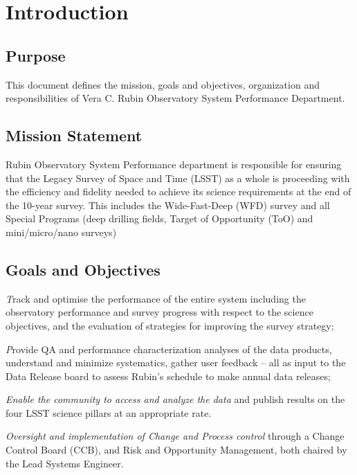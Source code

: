 \section{Introduction}
\subsection{Purpose}

This document defines the mission, goals and objectives, organization and responsibilities of Vera C. Rubin Observatory System Performance Department.

\subsection{Mission Statement}

Rubin Observatory System Performance department is responsible for ensuring that the Legacy Survey of Space and Time (LSST) as a whole is proceeding with the efficiency and fidelity needed to achieve its science requirements at the end of the 10-year survey. 
This includes the Wide-Fast-Deep (WFD) survey and all Special Programs (deep drilling fields, Target of Opportunity (ToO) and mini/micro/nano surveys)


\subsection{Goals and Objectives}

{\emph Track  and optimise} the performance of the entire system including the observatory performance and survey progress with respect to the science objectives, and the evaluation of strategies for improving the survey strategy;

{\emph Provide QA and performance characterization analyses}  of the data products, understand and minimize systematics, gather user feedback – all as input  to the Data Release board to assess Rubin’s schedule to make annual data releases;

\emph{Enable the community to access and analyze the data} and publish results on the four LSST science pillars at an appropriate rate.

\emph{Oversight and implementation of Change and Process control} through a Change Control Board (CCB), and Risk and Opportunity Management, both chaired by the Lead Systems Engineer.

